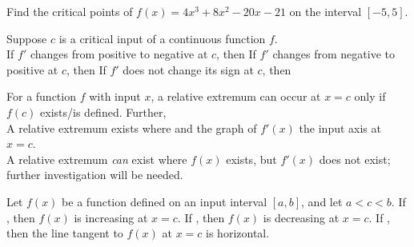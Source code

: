 \documentclass[notes]{subfiles}
\begin{document}
		
		\begin{ex}
			Find the critical points of $f(x) = 4x^3 + 8x^2 - 20x - 21$ on the interval $[-5,5]$.
		\end{ex}
			
		\begin{thm}
			Suppose $c$ is a critical input of a continuous function $f$. \\[15pt]
				\tabitem If $f'$ changes from positive to negative at $c$, then 
				\tabitem If $f'$ changes from negative to positive at $c$, then 
				\tabitem If $f'$ does not change its sign at $c$, then 
		\end{thm}
			
		\begin{thm}
			For a function $f$ with input $x$, a relative extremum can occur at $x = c$ only if $f(c)$ exists/is defined.  Further,\\
				\tabitem A relative extremum exists where  and the graph of $f'(x)$  the input axis at $x = c$.\\
				\tabitem A relative extremum \emph{can} exist where $f(x)$ exists, but $f'(x)$ does not exist; further investigation will be needed. 
		\end{thm}
			\newpage
			
		\begin{thm}
			Let $f(x)$ be a function defined on an input interval $[a,b]$, and let $a < c < b$.  
				\tabitem If , then $f(x)$ is increasing at $x = c$.
				\tabitem If , then $f(x)$ is decreasing at $x = c$.
				\tabitem If , then the line tangent to $f(x)$ at $x = c$ is horizontal.
		\end{thm}
			
\end{document}
